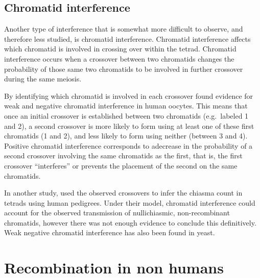 \subsection{Chromatid interference}

Another type of interference that is somewhat more difficult to observe, and therefore less studied, is chromatid interference.
Chromatid interference affects which chromatid is involved in crossing over within the tetrad.
Chromatid interference occurs when a crossover between two chromatids changes the probability of those same two chromatids to be involved in further crossover during the same meiosis.

By identifying which chromatid is involved in each crossover \citet{Hou2013} found evidence for weak and negative chromatid interference in human oocytes.
This means that once an initial crossover is established between two chromatids (e.g.\ labeled 1 and 2), a second crossover is more likely to form using at least one of these first chromatids (1 and 2), and less likely to form using neither (between 3 and 4).
Positive chromatid interference corresponds to adecrease in the probability of a second crossover involving the same chromatids as the first, that is, the first crossover ``interferes'' or prevents the placement of the second on the same chromatids.

In another study, \citet{Fledel-Alon2009} used the observed crossovers to infer the chiasma count in tetrads using human pedigrees.
Under their model, chromatid interference could account for the observed transmission of nullichiasmic, non-recombinant chromatids, however there was not enough evidence to conclude this definitively.
Weak negative chromatid interference has also been found in yeast\cite{Zhao1995a}.





\section{Recombination in non humans}


